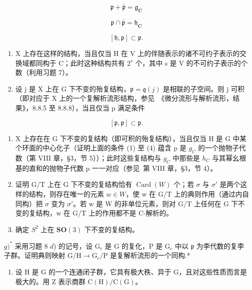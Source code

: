 \[
\mathfrak {p} + \bar {\mathfrak {p}} = \mathfrak {g} _ {\mathbf {C}}\tag{1}
\]

\[
\mathfrak {p} \cap \bar {\mathfrak {p}} = \mathfrak {h} _ {\mathbf {C}}\tag{2}
\]

\[
[ \mathfrak {h}, \mathfrak {p} ] \subset \mathfrak {p}.\tag{3}
\]

\begin{enumerate}
\def\labelenumi{\alph{enumi})}
\setcounter{enumi}{1}
\item
  X 上存在这样的结构，当且仅当 H 在 V 上的伴随表示的诸不可约子表示的交换域都同构于 C；此时这种结构共有 \(2^{s}\) 个，其中 s 是 V 的不可约子表示的个数（利用习题 7）。
\item
  设 j 是 X 上在 G 下不变的殆复结构，\(\mathfrak{p} = \mathfrak{q}(j)\) 是相联的子空间。则 j 可积（即对应于 X 上的一个复解析流形结构，参见~《微分流形与解析流形，结果》，8.8.5 至 8.8.8），当且仅当 p 满足条件
\end{enumerate}

\[
[ \mathfrak {p}, \mathfrak {p} ] \subset \mathfrak {p}.\tag{4}
\]

\begin{enumerate}
\def\labelenumi{\alph{enumi})}
\setcounter{enumi}{3}
\item
  X 上存在在 G 下不变的复结构（即可积的殆复结构），当且仅当 H 是 G 中某个环面的中心化子（证明上面的条件 (1) 至 (4) 蕴含 p 是 \(g_{C}\) 的一个抛物子代数（第 VIII 章，§3，节 5））；此时这些复结构与 \(g_{C}\) 中那些是 \(h_{C}\) 与其幂幺根基的直和的抛物子代数 p 一一对应（参见~第 VIII 章，§3，节 4）。
\item
  证明 G/T 上在 G 下不变的复结构恰有 \(\operatorname{Card}(W)\) 个；若 \(\sigma\) 与 \(\sigma'\) 是两个这样的结构，则存在唯一的元素 \(w \in W\)，使 w 在 G/T 上的典则作用（通过内自同构）把 \(\sigma\) 变为 \(\sigma'\)。若 w 是 W 的非单位元素，则对 G/T 上任何在 G 下不变的复结构，w 在 G/T 上的作用都不是 C-解析的。
\item
  确定 \(S^{2}\) 上在 \(\mathbf{SO}(3)\) 下不变的复结构。
\end{enumerate}

\(g)^{*}\) 采用习题 8 \(d\)) 的记号，设 \(\mathrm{G}_c\) 是 \(\mathrm{G}\) 的复化，\(\mathrm{P}\) 是 \(\mathrm{G}_c\) 中以 \(\mathfrak{p}\) 为李代数的复李子群。证明典则映射 \(\mathrm{G / H} \to \mathrm{G}_c / \mathrm{P}\) 是复解析流形的一个同构.*

\begin{enumerate}
\def\labelenumi{\arabic{enumi})}
\setcounter{enumi}{8}
\tightlist
\item
  设 H 是 G 的一个连通闭子群，它具有极大秩、异于 G，且对这些性质而言是极大的。用 Z 表示商群 \(\mathrm{C}(\mathrm{H})/\mathrm{C}(\mathrm{G})\)。
\end{enumerate}

